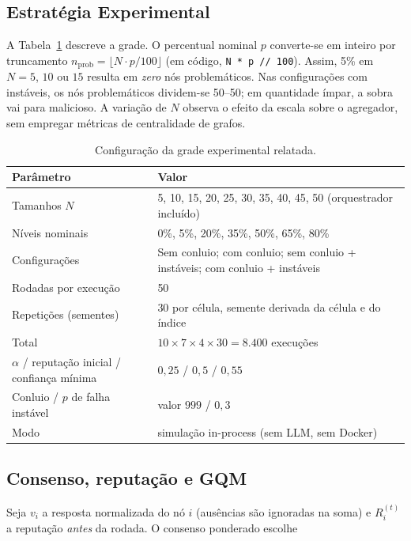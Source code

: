 \documentclass[12pt]{article}
\begin{document}
\subsection{Estratégia Experimental}

A Tabela~\ref{tab:grade} descreve a grade. O percentual nominal $p$ converte-se em inteiro por truncamento $n_{\mathrm{prob}} = \lfloor N \cdot p / 100 \rfloor$ (em código, \texttt{N * p // 100}). Assim, 5\% em $N=5$, $10$ ou $15$ resulta em \emph{zero} nós problemáticos. Nas configurações com instáveis, os nós problemáticos dividem-se 50--50; em quantidade ímpar, a sobra vai para malicioso. A variação de $N$ observa o efeito da escala sobre o agregador, sem empregar métricas de centralidade de grafos.

\begin{table}[htbp]
\centering
\caption{Configuração da grade experimental relatada.}
\label{tab:grade}
\footnotesize
\begin{tabular}{|l|p{9.2cm}|}
\hline
\textbf{Parâmetro} & \textbf{Valor} \\
\hline
Tamanhos $N$ & 5, 10, 15, 20, 25, 30, 35, 40, 45, 50 (orquestrador incluído) \\
\hline
Níveis nominais & 0\%, 5\%, 20\%, 35\%, 50\%, 65\%, 80\% \\
\hline
Configurações & Sem conluio; com conluio; sem conluio + instáveis; com conluio + instáveis \\
\hline
Rodadas por execução & 50 \\
\hline
Repetições (sementes) & 30 por célula, semente derivada da célula e do índice \\
\hline
Total & $10 \times 7 \times 4 \times 30 = 8{.}400$ execuções \\
\hline
$\alpha$ / reputação inicial / confiança mínima & $0{,}25$ / $0{,}5$ / $0{,}55$ \\
\hline
Conluio / $p$ de falha instável & valor $999$ / $0{,}3$ \\
\hline
Modo & simulação in-process (sem LLM, sem Docker) \\
\hline
\end{tabular}
\end{table}

\subsection{Consenso, reputação e GQM}

Seja $v_i$ a resposta normalizada do nó $i$ (ausências são ignoradas na soma) e $R_i^{(t)}$ a reputação \emph{antes} da rodada. O consenso ponderado escolhe
\end{document}
